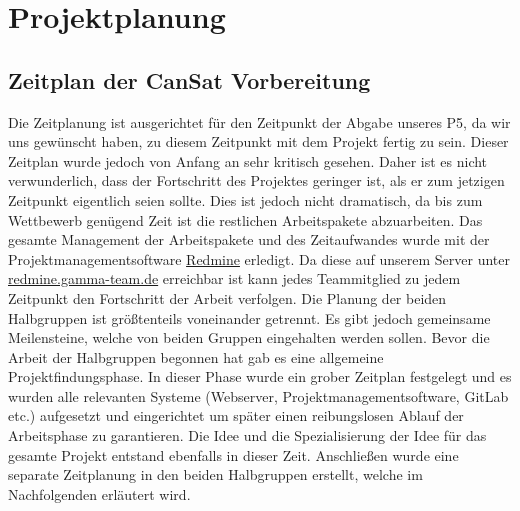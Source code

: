 \section{Projektplanung}
\subsection{Zeitplan der CanSat Vorbereitung}
Die Zeitplanung ist ausgerichtet für den Zeitpunkt der Abgabe unseres P5, da wir uns gewünscht haben, zu diesem Zeitpunkt mit dem Projekt fertig zu sein. Dieser Zeitplan wurde jedoch von Anfang an sehr kritisch gesehen. Daher ist es nicht verwunderlich, dass der Fortschritt des Projektes geringer ist, als er zum jetzigen Zeitpunkt eigentlich seien sollte. Dies ist jedoch nicht dramatisch, da bis zum Wettbewerb genügend Zeit ist die restlichen Arbeitspakete abzuarbeiten. Das gesamte Management der Arbeitspakete und des Zeitaufwandes wurde mit der Projektmanagementsoftware \href {www.redmine.org} {Redmine} erledigt. Da diese auf unserem Server unter \href{http://redmine.gamma-team.de}{redmine.gamma-team.de} erreichbar ist kann jedes Teammitglied zu jedem Zeitpunkt den Fortschritt der Arbeit verfolgen. Die Planung der beiden Halbgruppen ist größtenteils voneinander getrennt. Es gibt jedoch gemeinsame Meilensteine, welche von beiden Gruppen eingehalten werden sollen. Bevor die Arbeit der Halbgruppen begonnen hat gab es eine allgemeine Projektfindungsphase. In dieser Phase wurde ein grober Zeitplan festgelegt und es wurden alle relevanten Systeme (Webserver, Projektmanagementsoftware, GitLab etc.) aufgesetzt und eingerichtet um später einen reibungslosen Ablauf der Arbeitsphase zu garantieren. Die Idee und die Spezialisierung der Idee für das gesamte Projekt entstand ebenfalls in dieser Zeit. Anschließen wurde eine separate Zeitplanung in den beiden Halbgruppen erstellt, welche im Nachfolgenden erläutert wird.
